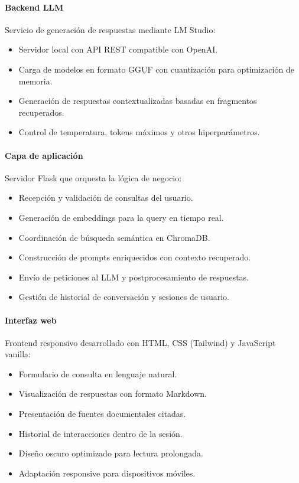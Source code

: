 \documentclass[a4paper,12pt]{article}
\begin{document}
\paragraph{Backend LLM}
Servicio de generación de respuestas mediante LM Studio:

\begin{itemize}
    \item Servidor local con API REST compatible con OpenAI.
    \item Carga de modelos en formato GGUF con cuantización para optimización de memoria.
    \item Generación de respuestas contextualizadas basadas en fragmentos recuperados.
    \item Control de temperatura, tokens máximos y otros hiperparámetros.
\end{itemize}

\paragraph{Capa de aplicación}
Servidor Flask que orquesta la lógica de negocio:

\begin{itemize}
    \item Recepción y validación de consultas del usuario.
    \item Generación de embeddings para la query en tiempo real.
    \item Coordinación de búsqueda semántica en ChromaDB.
    \item Construcción de prompts enriquecidos con contexto recuperado.
    \item Envío de peticiones al LLM y postprocesamiento de respuestas.
    \item Gestión de historial de conversación y sesiones de usuario.
\end{itemize}

\paragraph{Interfaz web}
Frontend responsivo desarrollado con HTML, CSS (Tailwind) y JavaScript vanilla:

\begin{itemize}
    \item Formulario de consulta en lenguaje natural.
    \item Visualización de respuestas con formato Markdown.
    \item Presentación de fuentes documentales citadas.
    \item Historial de interacciones dentro de la sesión.
    \item Diseño oscuro optimizado para lectura prolongada.
    \item Adaptación responsive para dispositivos móviles.
\end{itemize}
\end{document}

